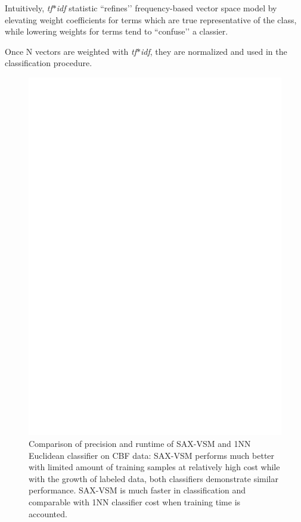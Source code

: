 \documentclass{llncs}
\begin{document}
Intuitively, \textit{tf$\ast$idf} statistic ``refines’’ frequency-based vector space model by
elevating weight coefficients for terms which are true representative of the class, while lowering
weights for terms tend to ``confuse’’ a classier.

Once N vectors are weighted with \textit{tf$\ast$idf}, they are normalized and used in the
classification procedure.
\begin{figure}[tbp]
   \centering
   \includegraphics[width=125mm]{figures/precision-runtime.ps}
   \caption{Comparison of precision and runtime of SAX-VSM and 1NN Euclidean classifier on
CBF data: SAX-VSM performs much better with limited amount of training samples at relatively high
cost while with the growth of labeled data, both classifiers demonstrate similar performance.
SAX-VSM is much faster in classification and comparable with 1NN classifier cost when training time
is accounted.}
   \label{fig:precision-runtime}
\end{figure}
\end{document}
